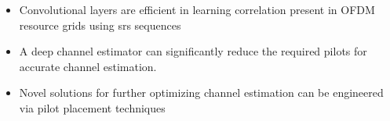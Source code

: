 \begin{itemize}
    \item Convolutional layers are efficient in learning correlation present in OFDM resource grids using \gls{srs} sequences
    \item A deep channel estimator can significantly reduce the required pilots for accurate channel estimation.
    \item Novel solutions for further optimizing channel estimation can be engineered via pilot placement techniques 
\end{itemize}
